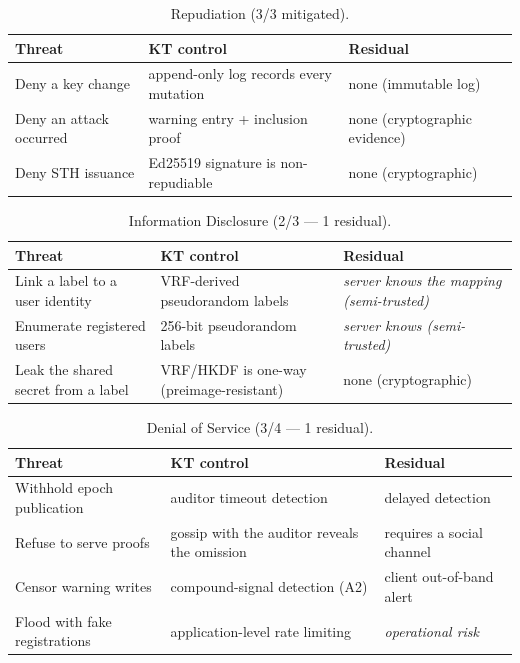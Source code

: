 \begin{table}[ht]
\centering
\caption{Repudiation (3/3 mitigated).}
\label{tab:stride-r}
\footnotesize
\begin{tabular}{@{}p{4.4cm}p{5.2cm}p{4.0cm}@{}}
\toprule
Threat & KT control & Residual \\
\midrule
Deny a key change & append-only log records every mutation & none (immutable log) \\
Deny an attack occurred & warning entry + inclusion proof & none (cryptographic evidence) \\
Deny STH issuance & Ed25519 signature is non-repudiable & none (cryptographic) \\
\bottomrule
\end{tabular}
\end{table}

\begin{table}[ht]
\centering
\caption{Information Disclosure (2/3 --- 1 residual).}
\label{tab:stride-i}
\footnotesize
\begin{tabular}{@{}p{4.4cm}p{5.2cm}p{4.0cm}@{}}
\toprule
Threat & KT control & Residual \\
\midrule
Link a label to a user identity & VRF-derived pseudorandom labels & \emph{server knows the mapping (semi-trusted)} \\
Enumerate registered users & 256-bit pseudorandom labels & \emph{server knows (semi-trusted)} \\
Leak the shared secret from a label & VRF/HKDF is one-way (preimage-resistant) & none (cryptographic) \\
\bottomrule
\end{tabular}
\end{table}

\begin{table}[ht]
\centering
\caption{Denial of Service (3/4 --- 1 residual).}
\label{tab:stride-d}
\footnotesize
\begin{tabular}{@{}p{4.4cm}p{5.2cm}p{4.0cm}@{}}
\toprule
Threat & KT control & Residual \\
\midrule
Withhold epoch publication & auditor timeout detection & delayed detection \\
Refuse to serve proofs & gossip with the auditor reveals the omission & requires a social channel \\
Censor warning writes & compound-signal detection (A2) & client out-of-band alert \\
Flood with fake registrations & application-level rate limiting & \emph{operational risk} \\
\bottomrule
\end{tabular}
\end{table}

